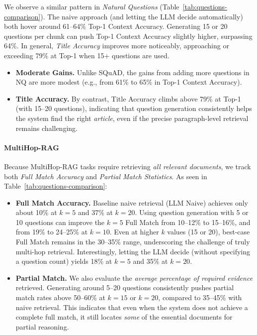 We observe a similar pattern in \emph{Natural Questions} (Table~\ref{tab:questions-comparison}). The naive approach 
(and letting the LLM decide automatically) both hover around 61–64\% Top-1 Context Accuracy. 
Generating 15 or 20 questions per chunk can push Top-1 Context Accuracy slightly higher, surpassing 64\%. 
In general, \emph{Title Accuracy} improves more noticeably, approaching or exceeding 79\% at Top-1 when 15+ questions are used.

\begin{itemize}
    \item \textbf{Moderate Gains.} Unlike SQuAD, the gains from adding more questions in NQ are more modest 
    (e.g., from 61\% to 65\% in Top-1 Context Accuracy).
    \item \textbf{Title Accuracy.} By contrast, Title Accuracy climbs above 79\% at Top-1 (with 15–20 questions), 
    indicating that question generation consistently helps the system find the right \emph{article}, even if 
    the precise paragraph-level retrieval remains challenging.
\end{itemize}





\paragraph{MultiHop-RAG}
Because MultiHop-RAG tasks require retrieving \emph{all relevant documents}, we track both \emph{Full Match Accuracy} 
and \emph{Partial Match Statistics}. As seen in Table~\ref{tab:questions-comparison}:

\begin{itemize}
    \item \textbf{Full Match Accuracy.} Baseline naive retrieval (LLM Naive) achieves only about 10\% at $k=5$ 
    and 37\% at $k=20$. Using question generation with 5 or 10 questions can improve the $k=5$ Full Match 
    from 10–12\% to 15–16\%, and from 19\% to 24–25\% at $k=10$. Even at higher $k$ values (15 or 20), 
    best-case Full Match remains in the 30–35\% range, underscoring the challenge of truly multi-hop retrieval. 
    Interestingly, letting the LLM decide (without specifying a question count) yields 18\% at $k=5$ and 35\% at $k=20$.
    \item \textbf{Partial Match.} We also evaluate the \emph{average percentage of required evidence} retrieved. 
    Generating around 5–20 questions consistently pushes partial match rates above 50–60\% at $k=15$ or $k=20$, 
    compared to 35–45\% with naive retrieval. This indicates that even when the system does not achieve a complete 
    full match, it still locates \emph{some} of the essential documents for partial reasoning.
\end{itemize}

